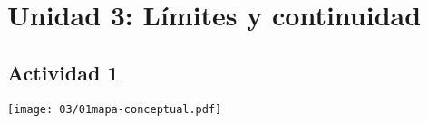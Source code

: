 \section*{Unidad 3: Límites y continuidad}

\subsection*{Actividad 1}
\texttt{[image: 03/01mapa-conceptual.pdf]}
